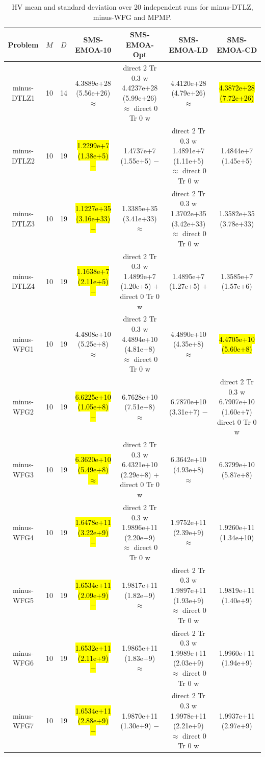 \documentclass[conference]{IEEEtran}
\newcommand{\semitextbf}[1]{%
	\pdfliteral direct {2 Tr 0.3 w} %
	#1%
	\pdfliteral direct {0 Tr 0 w}%
}
\begin{document}
\begin{table}[!t]\footnotesize
    \caption{HV mean and standard deviation over 20 independent runs for minus-DTLZ, minus-WFG and MPMP.} %
    \label{table_itri}
    \centering
    \begin{tabular}{ccccccc}
      \toprule
      Problem&$M$&$D$&SMS-EMOA-10&SMS-EMOA-Opt&SMS-EMOA-LD&SMS-EMOA-CD\\ 
      \midrule
      \multirow{1}{*}{minus-DTLZ1}&10&14&4.3889e+28 (5.56e+26) $\approx$&\semitextbf{4.4237e+28 (5.99e+26) $\approx$}&4.4120e+28 (4.79e+26) $\approx$&\hl{4.3872e+28 (7.72e+26)}\\
      \multirow{1}{*}{minus-DTLZ2}&10&19&\hl{1.2299e+7 (1.38e+5) $-$}&1.4737e+7 (1.55e+5) $-$&\semitextbf{1.4891e+7 (1.11e+5) $\approx$}&1.4844e+7 (1.45e+5)\\
      \multirow{1}{*}{minus-DTLZ3}&10&19&\hl{1.1227e+35 (3.16e+33) $-$}&1.3385e+35 (3.41e+33) $\approx$&\semitextbf{1.3702e+35 (3.42e+33) $\approx$}&1.3582e+35 (3.78e+33)\\
      \multirow{1}{*}{minus-DTLZ4}&10&19&\hl{1.1638e+7 (2.11e+5) $-$}&\semitextbf{1.4899e+7 (1.20e+5) $+$}&1.4895e+7 (1.27e+5) $+$&1.3585e+7 (1.57e+6)\\
      \hline
      \multirow{1}{*}{minus-WFG1}&10&19&4.4808e+10 (5.25e+8) $\approx$&\semitextbf{4.4894e+10 (4.81e+8) $\approx$}&4.4890e+10 (4.35e+8) $\approx$&\hl{4.4705e+10 (5.60e+8)}\\
      \multirow{1}{*}{minus-WFG2}&10&19&\hl{6.6225e+10 (1.05e+8) $-$}&6.7628e+10 (7.51e+8) $\approx$&6.7870e+10 (3.31e+7) $-$&\semitextbf{6.7907e+10 (1.60e+7)}\\
      \multirow{1}{*}{minus-WFG3}&10&19&\hl{6.3620e+10 (5.49e+8) $\approx$}&\semitextbf{6.4321e+10 (2.29e+8) $+$}&6.3642e+10 (4.93e+8) $\approx$&6.3799e+10 (5.87e+8)\\
      \multirow{1}{*}{minus-WFG4}&10&19&\hl{1.6478e+11 (3.22e+9) $-$}&\semitextbf{1.9896e+11 (2.20e+9) $\approx$}&1.9752e+11 (2.39e+9) $\approx$&1.9260e+11 (1.34e+10)\\
      \multirow{1}{*}{minus-WFG5}&10&19&\hl{1.6534e+11 (2.09e+9) $-$}&1.9817e+11 (1.82e+9) $\approx$&\semitextbf{1.9897e+11 (1.93e+9) $\approx$}&1.9819e+11 (1.40e+9)\\
      \multirow{1}{*}{minus-WFG6}&10&19&\hl{1.6532e+11 (2.11e+9) $-$}&1.9865e+11 (1.83e+9) $\approx$&\semitextbf{1.9989e+11 (2.03e+9) $\approx$}&1.9960e+11 (1.94e+9)\\
      \multirow{1}{*}{minus-WFG7}&10&19&\hl{1.6534e+11 (2.88e+9) $-$}&1.9870e+11 (1.30e+9) $-$&\semitextbf{1.9978e+11 (2.21e+9) $\approx$}&1.9937e+11 (2.97e+9)\\

\end{tabular}
\end{table}
\end{document}

